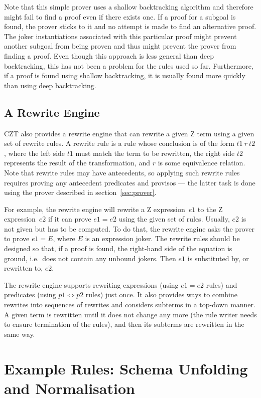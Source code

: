 \documentclass{entcs}
\begin{document}
Note that this simple prover uses a shallow backtracking algorithm and
therefore might fail to find a proof even if there exists one.  If a
proof for a subgoal is found, the prover sticks to it and no attempt
is made to find an alternative proof.  The joker instantiations
associated with this particular proof might prevent another subgoal
from being proven and thus might prevent the prover from finding a
proof.  Even though this approach is less general than deep
backtracking, this has not been a problem for the rules used so far.
Furthermore, if a proof is found using shallow backtracking, it is
usually found more quickly than using deep backtracking.

\subsection{A Rewrite Engine} \label{sec:rewrite}

CZT also provides a rewrite engine that can rewrite a given Z term
using a given set of rewrite rules.  A rewrite rule is a rule whose
conclusion is of the form $t1~r~t2$, where the left side $t1$ must
match the term to be rewritten, the right side $t2$ represents the
result of the transformation, and $r$ is some equivalence relation.
Note that rewrite rules may have antecedents, so applying such rewrite
rules requires proving any antecedent predicates and provisos --- the
latter task is done using the prover described in
section~\ref{sec:prover}.

For example, the rewrite engine will rewrite a Z expression~$e1$ to
the Z expression~$e2$ if it can prove $e1 = e2$ using the given set of
rules.  Usually, $e2$ is not given but has to be computed.  To do
that, the rewrite engine asks the prover to prove $e1 = E$, where $E$
is an expression joker.  The rewrite rules should be designed so that,
if a proof is found, the right-hand side of the equation is ground,
i.e.\ does not contain any unbound jokers.  Then $e1$ is substituted
by, or rewritten to, $e2$.

The rewrite engine supports rewriting expressions (using $e1 = e2$
rules) and predicates (using $p1 \iff p2$ rules) just once.  It also
provides ways to combine rewrites into sequences of rewrites and
considers subterms in a top-down manner.  A given term is rewritten
until it does not change any more (the rule writer needs to ensure
termination of the rules), and then its subterms are rewritten in the
same way.

\section{Example Rules: Schema Unfolding and Normalisation} \label{sec:schemas}
\end{document}
